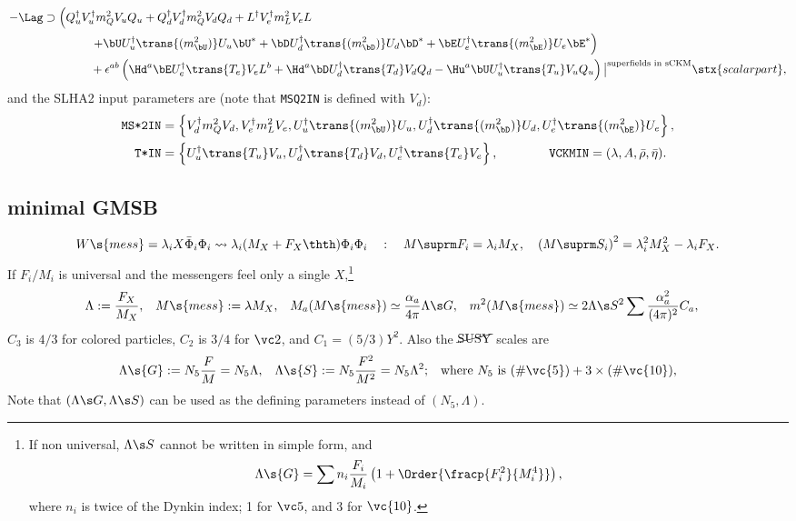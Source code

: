 \begin{align}
\begin{split}
 -\Lag&\supset%
 \left(
   Q_u^\dagger V_u^\dagger m_Q^2 V_uQ_u
 + Q_d^\dagger V_d^\dagger m_Q^2 V_dQ_d
 + L^\dagger   V_e^\dagger m_L^2 V_eL
 \right.\\&\qquad\qquad\left.
 + \bU U_u^\dagger \trans{(m_\bU^2)} U_u \bU^*
 + \bD U_d^\dagger \trans{(m_\bD^2)} U_d \bD^*
 + \bE U_e^\dagger \trans{(m_\bE^2)} U_e \bE^*
 \right)
 \\&\qquad\qquad
 +\epsilon^{ab}\left(\Hd^a \bE U_e^\dagger \trans{T_e} V_e L^b
                   + \Hd^a \bD U_d^\dagger \trans{T_d} V_d Q_d
                   - \Hu^a \bU U_u^\dagger \trans{T_u} V_u Q_u
\right)
 \big|^{\text{superfields in sCKM}}\stx{scalar part},
\end{split}
\end{align}
and the SLHA2 input parameters are (note that \texttt{MSQ2IN} is defined with $V_d$):
\begin{align*}
 \text{\texttt{MS*2IN}}&=\left\{
 V_d^\dagger m_Q^2 V_d,
 V_e^\dagger m_L^2 V_e,
 U_u^\dagger \trans{(m_\bU^2)} U_u,
 U_d^\dagger \trans{(m_\bD^2)} U_d,
 U_e^\dagger \trans{(m_\bE^2)} U_e
 \right\},\\
 \text{\texttt{T*IN}} &= \left\{
 U_u^\dagger \trans{T_u} V_u,
 U_d^\dagger \trans{T_d} V_d,
 U_e^\dagger \trans{T_e} V_e
 \right\},
 \qquad\qquad
 \text{\texttt{VCKMIN}}=(\lambda,A,\bar\rho,\bar\eta).
\end{align*}

\newpage
\subsection{minimal GMSB}
$$W\s{mess}=\lambda_i X\bar\Phi_i\Phi_i \leadsto \lambda_i(M_X+F_X\thth)\Phi_i\Phi_i\quad:\quad M\suprm F_i=\lambda_i M_X,\quad \left(M\suprm S_i\right)^2=\lambda_i^2M_X^2-\lambda_iF_X.$$
If $F_i/M_i$ is universal and the messengers feel only a single $X$,\footnote{%
If non universal, $\Lambda\s S$ cannot be written in simple form, and
\begin{equation}
\Lambda\s{G}=\sum n_i\frac{F_i}{M_i}\left(1+\Order{\fracp{F_i^2}{M_i^4}}\right),
\end{equation}
where $n_i$ is twice of the Dynkin index; 1 for $\vc 5$, and 3 for $\vc{10}$.
}
\begin{align}
\Lambda:=\frac{F_X}{M_X},& \quad M\s{mess}:=\lambda M_X,&
 M_a(M\s{mess})&\simeq\frac{\alpha_a}{4\pi}\Lambda\s G,
&m^2(M\s{mess})&\simeq2\Lambda\s S^2\sum\frac{\alpha_a^2}{(4\pi)^2}C_a,
\end{align}
$C_3$ is $4/3$ for colored particles, $C_2$ is $3/4$ for $\vc 2$, and $C_1=(5/3)Y^2$. Also the $\cancel{\rm SUSY}$ scales are
\begin{align}
 \Lambda\s{G}&:=N_5\frac{F}{M}=N_5\Lambda,
&
 \Lambda\s{S}&:=N_5\frac{F^2}{M^2}=N_5\Lambda^2;
 &
 \text{where $N_5$ is $(\#\vc{5})+3\times(\#\vc{10})$,}
\end{align}
Note that $(\Lambda\s G,\Lambda\s S)$ can be used as the defining parameters instead of $(N_5,\Lambda)$.

